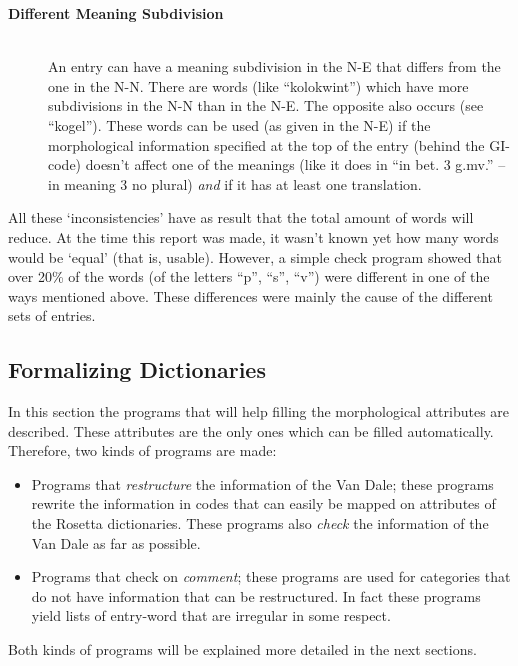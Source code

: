 \begin{description}
  \item [{\bf Different Meaning Subdivision}]\hspace{1cm}\\
        An entry can have a meaning subdivision in the N-E that differs from 
        the one in the N-N. There are words (like ``kolokwint'') which have more
        subdivisions in the N-N than in the N-E. The opposite also occurs (see 
        ``kogel''). These words can be used (as given in the N-E) if the 
        morphological information specified at the top of the entry (behind 
        the GI-code) doesn't affect one of the meanings (like it does in ``in 
        bet. 3 g.mv.'' -- in meaning 3 no plural) {\em and} if it has at least 
        one translation.
\end{description}

All these `inconsistencies' have as result that the total amount of words will
reduce. At the time this report was made, it wasn't known yet how many words
would be `equal' (that is, usable). However, a simple check program showed that 
over 20\% of the words (of the letters ``p'', ``s'', ``v'') were different in 
one of the ways mentioned above. These differences were mainly the cause of the 
different sets of entries.

\subsection{Formalizing Dictionaries}

In this section the programs that will help filling the morphological 
attributes are described. These attributes are the only ones which can be 
filled automatically. Therefore, two kinds of programs are made:

\begin{itemize}
  \item Programs that {\em restructure} the information of the Van Dale; these
        programs rewrite the information in codes that can easily be mapped 
        on attributes of the Rosetta dictionaries. These programs also
        {\em check} the information of the Van Dale as far as possible.
  \item Programs that check on {\em comment}; these programs are used for
        categories that do not have information that can be restructured.
        In fact these programs yield lists of entry-word that are irregular
        in some respect.
\end{itemize}

Both kinds of programs will be explained more detailed in the next sections.

